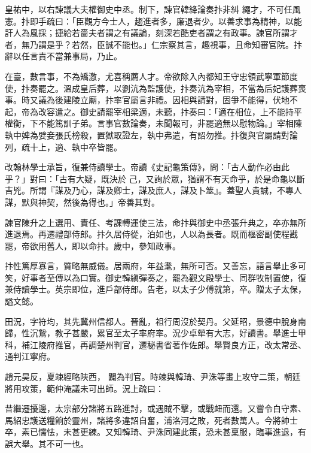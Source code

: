 \begin{pinyinscope}
 皇祐中，以右諫議大夫權御史中丞。制下，諫官韓絳論奏抃非糾
 繩才，不可任風憲。抃即手疏曰：「臣觀方今士人，趨進者多，廉退者少。以善求事為精神，以能訐人為風採；捷給若嗇夫者謂之有議論，刻深若酷吏者謂之有政事。諫官所謂才者，無乃謂是乎？若然，臣誠不能也。」仁宗察其言，趣視事，且命知審官院。抃辭以任言責不當兼事局，乃止。



 在臺，數言事，不為矯激，尤喜稱薦人才。帝欲除入內都知王守忠領武寧軍節度使，抃奏罷之。溫成皇后葬，以劉沆為監護使，抃奏沆為宰相，不當為后妃護葬喪
 事。時又議為後建陵立廟，抃率官屬言非禮。因相與請對，固爭不能得，伏地不起，帝為改容遣之。御史請罷宰相梁適，未聽，抃奏曰：「適在相位，上不能持平權衡，下不能篤訓子弟。言事官數論奏，未聞報可，非罷適無以慰物論。」宰相陳執中婢為嬖妾張氏榜殺，置獄取證左，執中弗遣，有詔勿推。抃復與官屬請對論列，疏十上，適、執中卒皆罷。



 改翰林學士承旨，復兼侍讀學士。帝讀《史記龜策傳》，問：「古人動作必由此乎？」對曰：「古有大疑，既決於
 己，又詢於眾，猶謂不有天命乎，於是命龜以斷吉兇。所謂『謀及乃心，謀及卿士，謀及庶人，謀及卜筮』。蓋聖人貴誠，不專人謀，默與神契，然後為得也。」帝善其對。



 諫官陳升之上選用、責任、考課轉運使三法，命抃與御史中丞張升典之，卒亦無所進退焉。再遷禮部侍郎。抃久居侍從，泊如也，人以為長者。既而樞密副使程戡罷，帝欲用舊人，即以命抃。歲中，參知政事。



 抃性篤厚寡言，質略無威儀。居兩府，年益耄，無所可否。又善忘，語言舉止多可
 笑，好事者至傳以為口實。御史韓縝彈奏之，罷為觀文殿學士、同群牧制置使，復兼侍讀學士。英宗即位，進戶部侍郎。告老，以太子少傅就第，卒。贈太子太保，謚文懿。



 田況，字符均，其先冀州信都人。晉亂，祖行周沒於契丹。父延昭，景德中脫身南歸，性沉鷙，教子甚嚴，累官至太子率府率。況少卓犖有大志，好讀書。舉進士甲科，補江陵府推官，再調楚州判官，遷秘書省著作佐郎。舉賢良方正，改太常丞、通判江寧府。



 趙元昊反，夏竦經略陜西，
 闢為判官。時竦與韓琦、尹洙等畫上攻守二策，朝廷將用攻策，範仲淹議未可出師。況上疏曰：



 昔繼遷擾邊，太宗部分諸將五路進討，或遇賊不擊，或戰衄而還。又嘗令白守素、馬紹忠護送糧餉於靈州，諸將多違詔自奮，浦洛河之敗，死者數萬人。今將帥士卒，素已懦怯，未甚更練。又知韓琦、尹洙同建此策，恐未甚稟服，臨事進退，有誤大舉。其不可一也。




\end{pinyinscope}

